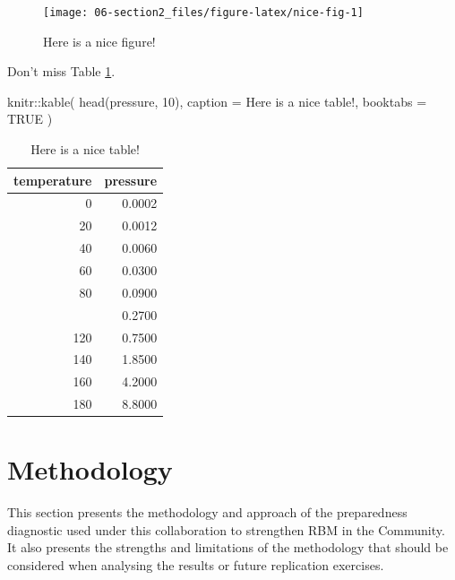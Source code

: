 \documentclass[
]{book}
\newenvironment{Shaded}{\begin{snugshade}}{\end{snugshade}}
\newcommand{\AttributeTok}[1]{\textcolor[rgb]{0.77,0.63,0.00}{#1}}
\newcommand{\ConstantTok}[1]{\textcolor[rgb]{0.00,0.00,0.00}{#1}}
\newcommand{\DecValTok}[1]{\textcolor[rgb]{0.00,0.00,0.81}{#1}}
\newcommand{\FunctionTok}[1]{\textcolor[rgb]{0.00,0.00,0.00}{#1}}
\newcommand{\NormalTok}[1]{#1}
\newcommand{\SpecialCharTok}[1]{\textcolor[rgb]{0.00,0.00,0.00}{#1}}
\newcommand{\StringTok}[1]{\textcolor[rgb]{0.31,0.60,0.02}{#1}}
\begin{document}
\begin{figure}

{\centering \texttt{[image: 06-section2\_files/figure-latex/nice-fig-1]} 

}

\caption{Here is a nice figure!}\label{fig:nice-fig}
\end{figure}

Don't miss Table \ref{tab:nice-tab}.

\begin{Shaded}
\begin{Highlighting}[]
\NormalTok{knitr}\SpecialCharTok{::}\FunctionTok{kable}\NormalTok{(}
  \FunctionTok{head}\NormalTok{(pressure, }\DecValTok{10}\NormalTok{), }\AttributeTok{caption =} \StringTok{\textquotesingle{}Here is a nice table!\textquotesingle{}}\NormalTok{,}
  \AttributeTok{booktabs =} \ConstantTok{TRUE}
\NormalTok{)}
\end{Highlighting}
\end{Shaded}

\begin{table}

\caption{\label{tab:nice-tab}Here is a nice table!}
\centering
\begin{tabular}[t]{rr}
\toprule
temperature & pressure\\
\midrule
0 & 0.0002\\
20 & 0.0012\\
40 & 0.0060\\
60 & 0.0300\\
80 & 0.0900\\
\addlinespace
100 & 0.2700\\
120 & 0.7500\\
140 & 1.8500\\
160 & 4.2000\\
180 & 8.8000\\
\bottomrule
\end{tabular}
\end{table}

\hypertarget{section3}{%
\chapter{Methodology}\label{section3}}

This section presents the methodology and approach of the preparedness diagnostic used under this collaboration to strengthen RBM in the Community. It also presents the strengths and limitations of the methodology that should be considered when analysing the results or future replication exercises.
\end{document}
